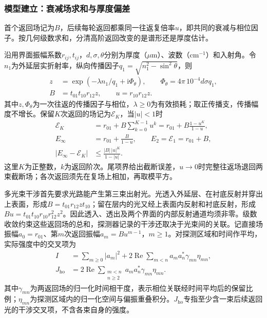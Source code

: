 \subsubsection{模型建立：衰减场求和与厚度偏差}

首个返回场记为$B$，后续每轮返回都乘同一往返复倍率$u$，即共同的衰减与相位因子。按几何级数求和，分清高阶返回改变的是谱形还是厚度估计。

\begingroup
\setlength{\abovedisplayskip}{4pt}
\setlength{\belowdisplayskip}{4pt}
\setlength{\abovedisplayshortskip}{2pt}
\setlength{\belowdisplayshortskip}{2pt}
\setlength{\jot}{1pt}
\setlength{\intextsep}{2pt}

沿用界面振幅系数$r_{ij},t_{ij}$，$d,\sigma,\theta$分别为厚度（$\mu\mathrm{m}$）、波数（$\mathrm{cm}^{-1}$）和入射角。令$n_1$为外延层实折射率，纵向传播因子$q_1=\sqrt{n_1^2-\sin^2\theta}$，则
\begin{equation}
\begin{aligned}
z&=\exp\!\left(-\lambda n_1/q_1+\mathrm{i}\Phi_\theta\right),\qquad
\Phi_\theta=4\pi\,10^{-4}d\sigma q_1,\\
B&=t_{01}t_{10}r_{12}z,\qquad u=r_{10}r_{12}z.
\end{aligned}
\label{eq:q3-return}
\end{equation}
其中$z,\Phi_\theta$为一次往返的传播因子与相位，$\lambda\geq0$为有效损耗；取正传播支，传播幅度不增长。保留$K$次返回的场记为$\mathcal E_K$，当$|u|<1$时
\begin{equation}
\begin{aligned}
\mathcal E_K&=r_{01}+B\sum\nolimits_{k=0}^{K-1}u^k
=r_{01}+B\frac{1-u^K}{1-u},\\
E_\infty&=r_{01}+\frac{B}{1-u},\qquad E_2=\mathcal E_1=r_{01}+B,\\
\left|E_\infty-\mathcal E_K\right|&\leq\frac{|B|\,|u|^K}{1-|u|}.
\end{aligned}
\label{eq:q3-series}
\end{equation}
这里$K$为正整数，$k$为返回阶次。尾项界给出截断误差，$u\to0$时完整往返场退回两束截断场；各次返回须先在复场上相加，再取模平方。

多光束干涉首先要求光路能产生第三束出射光。光透入外延层、在衬底反射并穿出上表面，形成$B=t_{01}r_{12}zt_{10}$；留在层内的光又经上表面内反射和衬底反射，形成$Bu=t_{01}t_{10}r_{10}r_{12}^{2}z^{2}$。因此透入、透出及两个界面的内部反射通道均须非零。级数收敛约束这些返回场的总和，探测器记录的干涉还取决于光束间的关联。记直接场振幅$a_0=r_{01}$、第$m$次返回振幅$a_m=Bu^{m-1}$，$m\geq1$。对探测区域和时间作平均，实际强度中的交叉项为
\begin{equation}
\begin{aligned}
I&=\sum_{m\geq0}|a_m|^2+
2\operatorname{Re}\sum_{m<n}a_ma_n^*\gamma_{mn}\eta_{mn},\\
J_{\mathrm{ho}}&=2\operatorname{Re}\sum_{\substack{m<n\\n\geq2}}
a_ma_n^*\gamma_{mn}\eta_{mn}.
\end{aligned}
\label{eq:q3-cross-conditions}
\end{equation}
其中$\gamma_{mn}$为两返回场的归一化时间相干度，表示相位关联经时间平均后的保留比例；$\eta_{mn}$为探测区域内的归一化空间与偏振重叠积分。$J_{\mathrm{ho}}$专指至少含一束后续返回光的干涉交叉项，不含各束自身的强度。

